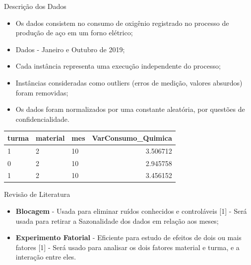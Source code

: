 \documentclass[
  ignorenonframetext,
]{beamer}
\providecommand{\tightlist}{%
  \setlength{\itemsep}{0pt}\setlength{\parskip}{0pt}}
\begin{document}
\begin{frame}{Descrição dos Dados}
\protect\hypertarget{descricao-dos-dados}{}

\begin{itemize}
\tightlist
\item
  Os dados consistem no consumo de oxigênio registrado no processo de
  produção de aço em um forno elétrico;
\item
  Dados - Janeiro e Outubro de 2019;
\item
  Cada instância representa uma execução independente do processo;
\item
  Instâncias consideradas como outliers (erros de medição, valores
  absurdos) foram removidas;
\item
  Os dados foram normalizados por uma constante aleatória, por questões
  de confidencialidade.
\end{itemize}

\begin{table}[H]
\centering
\begin{tabular}{l|l|l|r}
\hline
turma & material & mes & VarConsumo\_Quimica\\
\hline
1 & 2 & 10 & 3.506712\\
\hline
0 & 2 & 10 & 2.945758\\
\hline
1 & 2 & 10 & 3.456152\\
\hline
\end{tabular}
\end{table}

\end{frame}

\begin{frame}{Revisão de Literatura}
\protect\hypertarget{revisao-de-literatura}{}

\begin{itemize}
\item
  \textbf{Blocagem} - Usada para eliminar ruídos conhecidos e
  controláveis {[}1{]} - Será usada para retirar a Sazonalidade dos
  dados em relação aos meses;
\item
  \textbf{Experimento Fatorial} - Eficiente para estudo de efeitos de
  dois ou mais fatores {[}1{]} - Será usado para analisar os dois
  fatores material e turma, e a interação entre eles.
\end{itemize}

\end{frame}
\end{document}
